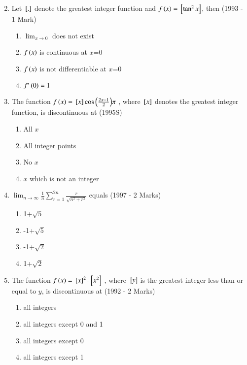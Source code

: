 \documentclass[journal,12pt,onecolumn]{IEEEtran}
\theoremstyle{remark}
\begin{document}
\begin{enumerate}
\begin{multicols}{2}
\begin{enumerate}
     
  \end{enumerate}
 \end{multicols}	

\item Let ${}\left[.\right]$ denote the greatest integer function and $f\left(x\right)={}\left[\tan^2{x}\right]$, then
	\hfill{(1993 - 1 Mark)}
 \begin{multicols}{2}
    \begin{enumerate}
        \item $\lim_{x\to 0}$ does not exist
        \item $f\left(x\right)$ is continuous at $x$=0
        \item $f\left(x\right)$ is not differentiable at $x$=0
        \item $f^{\prime}\left(0\right)=1$
        
    \end{enumerate}
 \end{multicols}	

\item The function $f\left(x\right)={}\left[x\right]\cos{\ensuremath{\left(\frac{2x-1}{2}\right)}}\pi$ , where ${}\left[x\right]$ denotes the greatest integer function, is discontinuous at
	\hfill{(1995S)}
 \begin{multicols}{2}
   \begin{enumerate}
       \item All $x$
       \item All integer points
       \item No $x$
       \item $x$ which is not an integer
   \end{enumerate}
 \end{multicols}	

\item $\lim_{n\to \infty}\frac{1}{n}\sum_{r=1}^{2n}\frac{r}{\sqrt{n^2+r^2}}$ equals
	\hfill{(1997 - 2 Marks)}
 \begin{multicols}{2}	
  \begin{enumerate}
      \item 1+$\sqrt{5}$
      \item -1+$\sqrt{5}$
      \item -1+$\sqrt{2}$
      \item 1+$\sqrt{2}$
      
  \end{enumerate}
 \end{multicols}	

\item The function $f\left(x\right)={}\left[x\right]^2$-${}\left[x^2\right]$ , where ${}\left[y\right]$ is the greatest integer less than or equal to $y$, is discontinuous at
	\hfill{(1992 - 2 Marks)}
 \begin{multicols}{2}	
     \begin{enumerate}
         \item all integers
         \item all integers except 0 and 1
         \item all integers except 0
         \item all integers except 1
         

\end{enumerate}
\end{multicols}
\end{enumerate}
\end{document}
